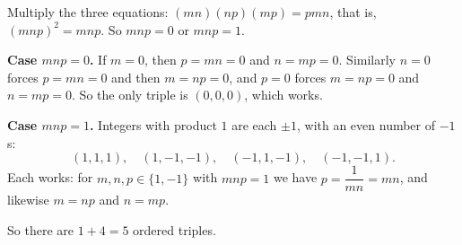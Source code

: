 Multiply the three equations: $(mn)(np)(mp)=pmn$, that is, $(mnp)^2=mnp$. So $mnp=0$ or $mnp=1$.

\textbf{Case $mnp=0$.} If $m=0$, then $p=mn=0$ and $n=mp=0$. Similarly $n=0$ forces $p=mn=0$ and then $m=np=0$, and $p=0$ forces $m=np=0$ and $n=mp=0$. So the only triple is $(0,0,0)$, which works.

\textbf{Case $mnp=1$.} Integers with product $1$ are each $\pm1$, with an even number of $-1$s:
\[
(1,1,1),\quad(1,-1,-1),\quad(-1,1,-1),\quad(-1,-1,1).
\]
Each works: for $m,n,p\in\{1,-1\}$ with $mnp=1$ we have $p=\dfrac{1}{mn}=mn$, and likewise $m=np$ and $n=mp$.

So there are $1+4=\boxed{5}$ ordered triples.
